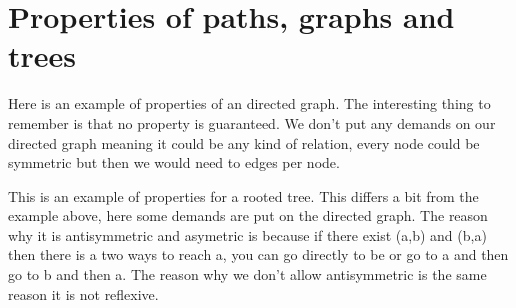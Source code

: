 \documentclass[a5paper]{article}
\begin{document}
\newpage
\section*{Properties of paths, graphs and trees}
Here is an example of properties of an directed graph.
The interesting thing to remember is that no property is guaranteed.
We don't put any demands on our directed graph meaning it could be any kind of relation,
every node could be symmetric but then we would need to edges per node.
\begin{figure}[ht]
	\centering
\end{figure}

This is an example of properties for a rooted tree.
This differs a bit from the example above, here some demands are put on the directed graph.
The reason why it is antisymmetric and asymetric is because if there exist (a,b) and (b,a) then there is a two ways to reach a,
you can go directly to be or go to a and then go to b and then a.
The reason why we don't allow antisymmetric is the same reason it is not reflexive.
\begin{figure}[ht]
	\centering
\end{figure}
\end{document}
